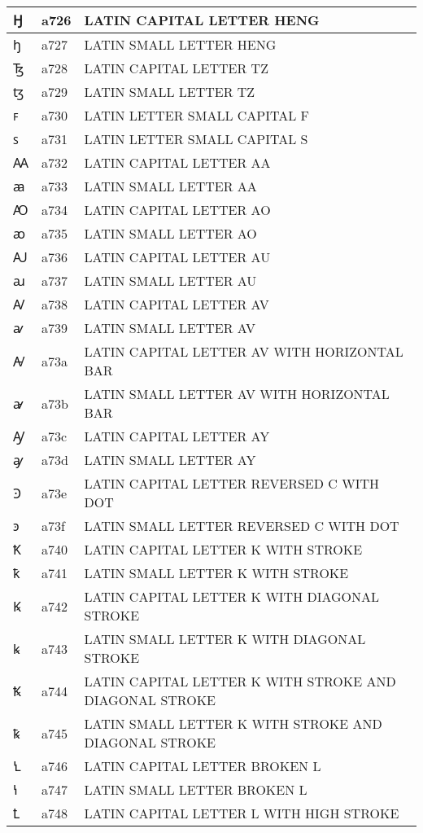 \documentclass[12pt,letterpaper,openany]{book}
\begin{document}
\begin{center}
\begin{supertabular}{|m{0.25in}|m{0.5in}|m{4in}|}
Ꜧ & a726 & LATIN CAPITAL LETTER HENG\\\hline
ꜧ & a727 & LATIN SMALL LETTER HENG\\\hline
Ꜩ & a728 & LATIN CAPITAL LETTER TZ\\\hline
ꜩ & a729 & LATIN SMALL LETTER TZ\\\hline
ꜰ & a730 & LATIN LETTER SMALL CAPITAL F\\\hline
ꜱ & a731 & LATIN LETTER SMALL CAPITAL S\\\hline
Ꜳ & a732 & LATIN CAPITAL LETTER AA\\\hline
ꜳ & a733 & LATIN SMALL LETTER AA\\\hline
Ꜵ & a734 & LATIN CAPITAL LETTER AO\\\hline
ꜵ & a735 & LATIN SMALL LETTER AO\\\hline
Ꜷ & a736 & LATIN CAPITAL LETTER AU\\\hline
ꜷ & a737 & LATIN SMALL LETTER AU\\\hline
Ꜹ & a738 & LATIN CAPITAL LETTER AV\\\hline
ꜹ & a739 & LATIN SMALL LETTER AV\\\hline
Ꜻ & a73a & LATIN CAPITAL LETTER AV WITH HORIZONTAL BAR\\\hline
ꜻ & a73b & LATIN SMALL LETTER AV WITH HORIZONTAL BAR\\\hline
Ꜽ & a73c & LATIN CAPITAL LETTER AY\\\hline
ꜽ & a73d & LATIN SMALL LETTER AY\\\hline
Ꜿ & a73e & LATIN CAPITAL LETTER REVERSED C WITH DOT\\\hline
ꜿ & a73f & LATIN SMALL LETTER REVERSED C WITH DOT\\\hline
Ꝁ & a740 & LATIN CAPITAL LETTER K WITH STROKE\\\hline
ꝁ & a741 & LATIN SMALL LETTER K WITH STROKE\\\hline
Ꝃ & a742 & LATIN CAPITAL LETTER K WITH DIAGONAL STROKE\\\hline
ꝃ & a743 & LATIN SMALL LETTER K WITH DIAGONAL STROKE\\\hline
Ꝅ & a744 & LATIN CAPITAL LETTER K WITH STROKE AND DIAGONAL STROKE\\\hline
ꝅ & a745 & LATIN SMALL LETTER K WITH STROKE AND DIAGONAL STROKE\\\hline
Ꝇ & a746 & LATIN CAPITAL LETTER BROKEN L\\\hline
ꝇ & a747 & LATIN SMALL LETTER BROKEN L\\\hline
Ꝉ & a748 & LATIN CAPITAL LETTER L WITH HIGH STROKE\\\hline

\end{supertabular}
\end{center}
\end{document}
